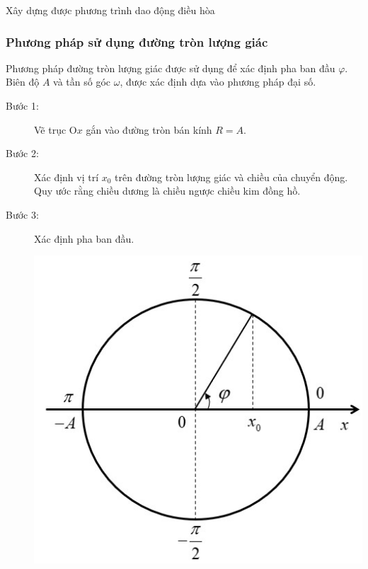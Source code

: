 \begin{dang}{Xây dựng được phương trình dao động điều hòa}
{		\subsubsection{Phương pháp sử dụng đường tròn lượng giác}
		
		Phương pháp đường tròn lượng giác được sử dụng để xác định pha ban đầu $\varphi$. Biên độ $A$ và tần số góc $\omega$, được xác định dựa vào phương pháp đại số. 
		\begin{description}
			\item[Bước 1:] Vẽ trục $\text{O}x$ gắn vào đường tròn bán kính $R=A$.
			\item[Bước 2:] Xác định vị trí $x_0$ trên đường tròn lượng giác và chiều của chuyển động. Quy ước rằng chiều dương là chiều ngược chiều kim đồng hồ.
			\item[Bước 3:] Xác định pha ban đầu.
			\begin{center}
				\includegraphics[scale=0.7]{../figs/VN12-PH-02-A-001-1-V2-3.jpg}
			\end{center}
		\end{description}
		}
\end{dang}

